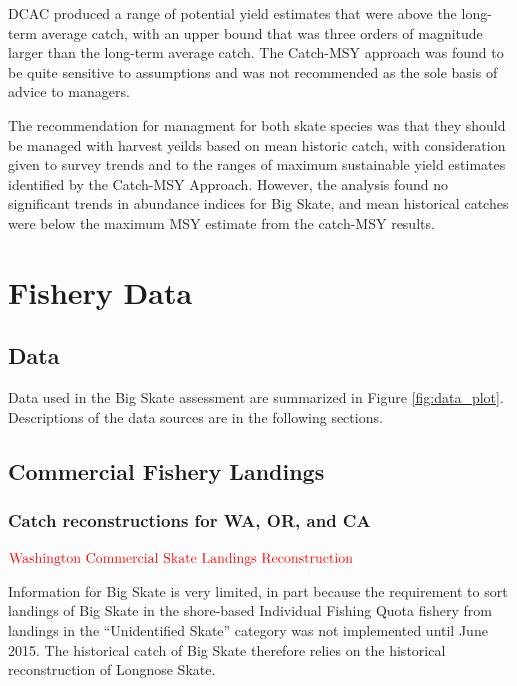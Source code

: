 \documentclass[12pt,]{article}
\begin{document}
DCAC produced a range of potential yield estimates that were above the
long-term average catch, with an upper bound that was three orders of
magnitude larger than the long-term average catch. The Catch-MSY
approach was found to be quite sensitive to assumptions and was not
recommended as the sole basis of advice to managers.

The recommendation for managment for both skate species was that they
should be managed with harvest yeilds based on mean historic catch, with
consideration given to survey trends and to the ranges of maximum
sustainable yield estimates identified by the Catch-MSY Approach.
However, the analysis found no significant trends in abundance indices
for Big Skate, and mean historical catches were below the maximum MSY
estimate from the catch-MSY results.

\newpage

\hypertarget{fishery-data}{%
\section{Fishery Data}\label{fishery-data}}

\hypertarget{data}{%
\subsection{Data}\label{data}}

Data used in the Big Skate assessment are summarized in Figure
\ref{fig:data_plot}. Descriptions of the data sources are in the
following sections.

\hypertarget{commercial-fishery-landings}{%
\subsection{Commercial Fishery
Landings}\label{commercial-fishery-landings}}

\hypertarget{catch-reconstructions-for-wa-or-and-ca}{%
\subsubsection{Catch reconstructions for WA, OR, and
CA}\label{catch-reconstructions-for-wa-or-and-ca}}

\textbf{\(\color{red}{\text{Washington Commercial Skate Landings Reconstruction}}\)}

Information for Big Skate is very limited, in part because the
requirement to sort landings of Big Skate in the shore-based Individual
Fishing Quota fishery from landings in the ``Unidentified Skate''
category was not implemented until June 2015. The historical catch of
Big Skate therefore relies on the historical reconstruction of Longnose
Skate.
\end{document}
